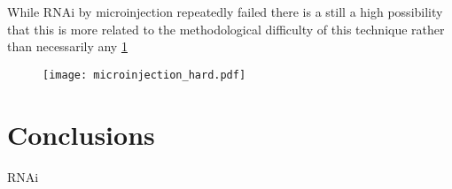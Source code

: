 While RNAi by microinjection repeatedly failed there is a still a high possibility
that this is more related to the methodological difficulty of this technique rather than
necessarily any 
\cref{fig:microinjection_nucleus}

\begin{figure}
    \texttt{[image: microinjection\_hard.pdf]}
    \caption{}
    \label{fig:microinjection_nucleus}
\end{figure}






\section{Conclusions}

RNAi 
